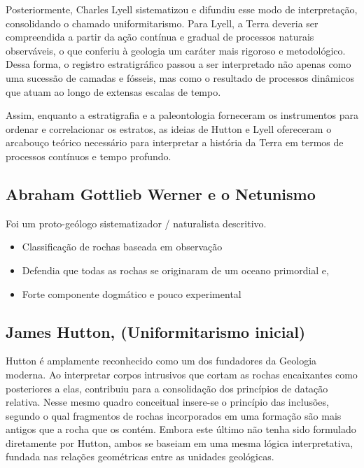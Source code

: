 Posteriormente, Charles Lyell sistematizou e difundiu esse modo de interpretação, consolidando o chamado uniformitarismo. Para Lyell, a Terra deveria ser compreendida a partir da ação contínua e gradual de processos naturais observáveis, o que conferiu à geologia um caráter mais rigoroso e metodológico. Dessa forma, o registro estratigráfico passou a ser interpretado não apenas como uma sucessão de camadas e fósseis, mas como o resultado de processos dinâmicos que atuam ao longo de extensas escalas de tempo.

Assim, enquanto a estratigrafia e a paleontologia forneceram os instrumentos para ordenar e correlacionar os estratos, as ideias de Hutton e Lyell ofereceram o arcabouço teórico necessário para interpretar a história da Terra em termos de processos contínuos e tempo profundo.

\subsection{Abraham Gottlieb Werner e o Netunismo}

Foi um proto-geólogo sistematizador / naturalista descritivo.

\begin{itemize}[label=$\diamond$]
    \item Classificação de rochas baseada em observação
    \item Defendia que todas as rochas se originaram de um oceano primordial e,
    \item Forte componente dogmático e pouco experimental
\end{itemize}

\subsection{James Hutton, (Uniformitarismo inicial)}

Hutton é amplamente reconhecido como um dos fundadores da Geologia moderna. Ao interpretar corpos intrusivos que cortam as rochas encaixantes como posteriores a elas, contribuiu para a consolidação dos princípios de datação relativa. Nesse mesmo quadro conceitual insere-se o princípio das inclusões, segundo o qual fragmentos de rochas incorporados em uma formação são mais antigos que a rocha que os contém. Embora este último não tenha sido formulado diretamente por Hutton, ambos se baseiam em uma mesma lógica interpretativa, fundada nas relações geométricas entre as unidades geológicas.

